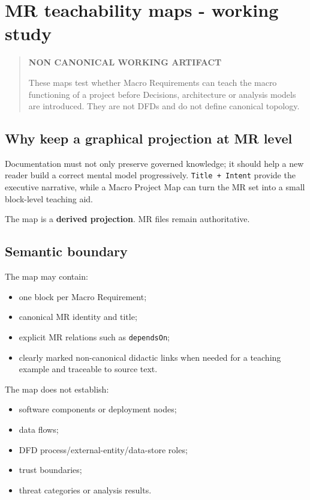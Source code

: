 \documentclass[
  10pt,
]{article}
\author{}
\date{}
\providecommand{\tightlist}{%
  \setlength{\itemsep}{0pt}\setlength{\parskip}{0pt}}
\begin{document}
\section{MR teachability maps - working
study}\label{mr-teachability-maps---working-study}

\begin{quote}
\textbf{NON CANONICAL WORKING ARTIFACT}

These maps test whether Macro Requirements can teach the macro
functioning of a project before Decisions, architecture or analysis
models are introduced. They are not DFDs and do not define canonical
topology.
\end{quote}

\subsection{Why keep a graphical projection at MR
level}\label{why-keep-a-graphical-projection-at-mr-level}

Documentation must not only preserve governed knowledge; it should help
a new reader build a correct mental model progressively.
\texttt{Title\ +\ Intent} provide the executive narrative, while a Macro
Project Map can turn the MR set into a small block-level teaching aid.

The map is a \textbf{derived projection}. MR files remain authoritative.

\subsection{Semantic boundary}\label{semantic-boundary}

The map may contain:

\begin{itemize}
\tightlist
\item
  one block per Macro Requirement;
\item
  canonical MR identity and title;
\item
  explicit MR relations such as \texttt{dependsOn};
\item
  clearly marked non-canonical didactic links when needed for a teaching
  example and traceable to source text.
\end{itemize}

The map does not establish:

\begin{itemize}
\tightlist
\item
  software components or deployment nodes;
\item
  data flows;
\item
  DFD process/external-entity/data-store roles;
\item
  trust boundaries;
\item
  threat categories or analysis results.
\end{itemize}
\end{document}
